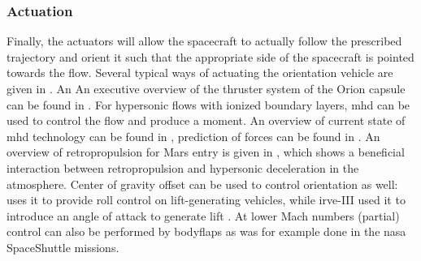\subsubsection{Actuation}
Finally, the actuators will allow the spacecraft to actually follow the prescribed trajectory and orient it such that the appropriate side of the spacecraft is pointed towards the flow. Several typical ways of actuating the orientation vehicle are given in \cite{Wertz2011}. An An executive overview of the thruster system of the Orion capsule can be found in \cite{Jones2012}. For hypersonic flows with ionized boundary layers, \gls{mhd} can be used to control the flow and produce a moment. An overview of current state of \gls{mhd} technology can be found in \cite{Braun2009}, prediction of forces can be found in \cite{Kawamura2013}. An overview of retropropulsion for Mars entry is given in \cite{Korzun2009}, which shows a beneficial interaction between retropropulsion and hypersonic deceleration in the atmosphere. Center of gravity offset can be used to control orientation as well: \cite{Petsopoulos1996} uses it to provide roll control on lift-generating vehicles, while \gls{irve}-III used it to introduce an angle of attack to generate lift \cite{Dillman2012a}. At lower Mach numbers (partial) control can also be performed by bodyflaps as was for example done in the \gls{nasa} SpaceShuttle missions.